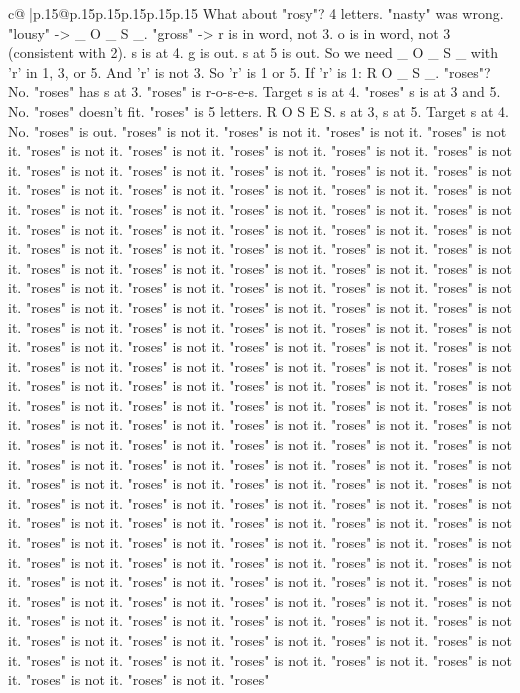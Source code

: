 \documentclass{article}
\begin{document}
{\begin{supertabular}{c@{$\;$}|p{.15\linewidth}@{}p{.15\linewidth}p{.15\linewidth}p{.15\linewidth}p{.15\linewidth}p{.15\linewidth}}
{{{What about "rosy"? 4 letters. "nasty" was wrong. "lousy" {-}> \_ O \_ S \_. "gross" {-}> r is in word, not 3. o is in word, not 3 (consistent with 2). s is at 4. g is out. s at 5 is out. So we need \_ O \_ S \_ with 'r' in 1, 3, or 5. And 'r' is not 3. So 'r' is 1 or 5. If 'r' is 1: R O \_ S \_. "roses"? No. "roses" has s at 3. "roses" is r{-}o{-}s{-}e{-}s. Target s is at 4. "roses" s is at 3 and 5. No. "roses" doesn't fit. "roses" is 5 letters. R O S E S. s at 3, s at 5. Target s at 4. No. "roses" is out. "roses" is not it. "roses" is not it. "roses" is not it. "roses" is not it. "roses" is not it. "roses" is not it. "roses" is not it. "roses" is not it. "roses" is not it. "roses" is not it. "roses" is not it. "roses" is not it. "roses" is not it. "roses" is not it. "roses" is not it. "roses" is not it. "roses" is not it. "roses" is not it. "roses" is not it. "roses" is not it. "roses" is not it. "roses" is not it. "roses" is not it. "roses" is not it. "roses" is not it. "roses" is not it. "roses" is not it. "roses" is not it. "roses" is not it. "roses" is not it. "roses" is not it. "roses" is not it. "roses" is not it. "roses" is not it. "roses" is not it. "roses" is not it. "roses" is not it. "roses" is not it. "roses" is not it. "roses" is not it. "roses" is not it. "roses" is not it. "roses" is not it. "roses" is not it. "roses" is not it. "roses" is not it. "roses" is not it. "roses" is not it. "roses" is not it. "roses" is not it. "roses" is not it. "roses" is not it. "roses" is not it. "roses" is not it. "roses" is not it. "roses" is not it. "roses" is not it. "roses" is not it. "roses" is not it. "roses" is not it. "roses" is not it. "roses" is not it. "roses" is not it. "roses" is not it. "roses" is not it. "roses" is not it. "roses" is not it. "roses" is not it. "roses" is not it. "roses" is not it. "roses" is not it. "roses" is not it. "roses" is not it. "roses" is not it. "roses" is not it. "roses" is not it. "roses" is not it. "roses" is not it. "roses" is not it. "roses" is not it. "roses" is not it. "roses" is not it. "roses" is not it. "roses" is not it. "roses" is not it. "roses" is not it. "roses" is not it. "roses" is not it. "roses" is not it. "roses" is not it. "roses" is not it. "roses" is not it. "roses" is not it. "roses" is not it. "roses" is not it. "roses" is not it. "roses" is not it. "roses" is not it. "roses" is not it. "roses" is not it. "roses" is not it. "roses" is not it. "roses" is not it. "roses" is not it. "roses" is not it. "roses" is not it. "roses" is not it. "roses" is not it. "roses" is not it. "roses" is not it. "roses" is not it. "roses" is not it. "roses" is not it. "roses" is not it. "roses" is not it. "roses" is not it. "roses" is not it. "roses" is not it. "roses" is not it. "roses" is not it. "roses" is not it. "roses" is not it. "roses" is not it. "roses" is not it. "roses" is not it. "roses" is not it. "roses" is not it. "roses" is not it. "roses" is not it. "roses" is not it. "roses" is not it. "roses" is not it. "roses" is not it. "roses" is not it. "roses" is not it. "roses" is not it. "roses" is not it. "roses" is not it. "roses" is not it. "roses" is not it. "roses" is not it. "roses" }}}
\end{supertabular}}
\end{document}
